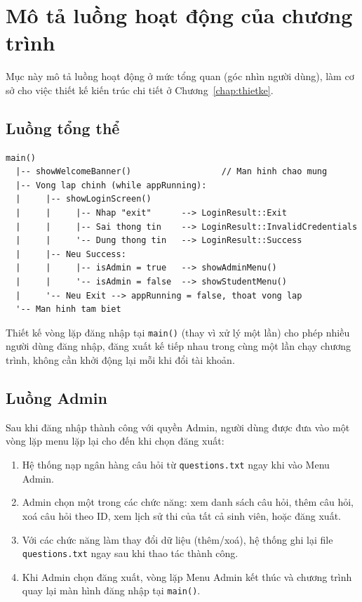 \documentclass[11pt]{report}
\begin{document}
\section{Mô tả luồng hoạt động của chương trình}
\label{sec:luonghoatdong}

Mục này mô tả luồng hoạt động ở mức tổng quan (góc nhìn người dùng), làm cơ sở cho việc thiết kế kiến trúc chi tiết ở Chương~\ref{chap:thietke}.

\subsection*{Luồng tổng thể}

\begin{verbatim}
main()
  |-- showWelcomeBanner()                  // Man hinh chao mung
  |-- Vong lap chinh (while appRunning):
  |     |-- showLoginScreen()
  |     |     |-- Nhap "exit"      --> LoginResult::Exit
  |     |     |-- Sai thong tin    --> LoginResult::InvalidCredentials 
  |     |     '-- Dung thong tin   --> LoginResult::Success
  |     |-- Neu Success:
  |     |     |-- isAdmin = true   --> showAdminMenu()
  |     |     '-- isAdmin = false  --> showStudentMenu()
  |     '-- Neu Exit --> appRunning = false, thoat vong lap
  '-- Man hinh tam biet
\end{verbatim}

Thiết kế vòng lặp đăng nhập tại \texttt{main()} (thay vì xử lý một lần) cho phép nhiều người dùng đăng nhập, đăng xuất kế tiếp nhau trong cùng một lần chạy chương trình, không cần khởi động lại mỗi khi đổi tài khoản.

\subsection*{Luồng Admin}

Sau khi đăng nhập thành công với quyền Admin, người dùng được đưa vào một vòng lặp menu lặp lại cho đến khi chọn đăng xuất:

\begin{enumerate}[leftmargin=*, label=\arabic*.]
    \item Hệ thống nạp ngân hàng câu hỏi từ \texttt{questions.txt} ngay khi vào Menu Admin.
    \item Admin chọn một trong các chức năng: xem danh sách câu hỏi, thêm câu hỏi, xoá câu hỏi theo ID, xem lịch sử thi của tất cả sinh viên, hoặc đăng xuất.
    \item Với các chức năng làm thay đổi dữ liệu (thêm/xoá), hệ thống ghi lại file \texttt{questions.txt} ngay sau khi thao tác thành công.
    \item Khi Admin chọn đăng xuất, vòng lặp Menu Admin kết thúc và chương trình quay lại màn hình đăng nhập tại \texttt{main()}.
\end{enumerate}
\end{document}
